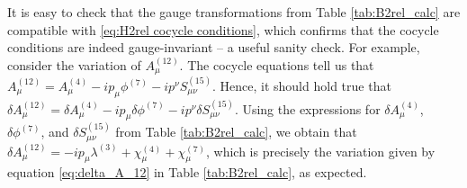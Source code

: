 \documentclass[11pt,reqno,a4paper,final]{amsart}
\theoremstyle{plain}
\theoremstyle{definition}
\newcommand{\phisup}[1]{\phi^{(#1)}}
\newcommand{\Asup}[1]{A^{(#1)}}
\newcommand{\1}{\mathbb{1}}
\numberwithin{equation}{section}
\begin{document}
\begin{appendices}
It is easy to check that the gauge transformations from Table \ref{tab:B2rel_calc} are compatible with \eqref{eq:H2rel cocycle conditions}, which confirms that the cocycle conditions are indeed gauge-invariant -- a useful sanity check. For example, consider the variation of $\Asup{12}_\mu$. The cocycle equations tell us that $\Asup{12}_\mu = \Asup{4}_\mu - ip_\mu \phisup{7} - ip^\nu S^{(15)}_{\mu\nu}$. Hence, it should hold true that $\delta \Asup{12}_\mu = \delta \Asup{4}_\mu - ip_\mu \delta \phisup{7} - ip^\nu \delta S^{(15)}_{\mu\nu}$. Using the expressions for $\delta \Asup{4}_\mu$, $\delta \phisup{7}$, and $\delta S_{\mu\nu}^{(15)}$ from Table \ref{tab:B2rel_calc}, we obtain that $\delta \Asup{12}_\mu =  -ip_\mu \lambda^{(3)} + \chi^{(4)}_\mu + \chi^{(7)}_\mu$, which is precisely the variation given by equation \eqref{eq:delta_A_12} in Table \ref{tab:B2rel_calc}, as expected.


\end{appendices}
\end{document}
